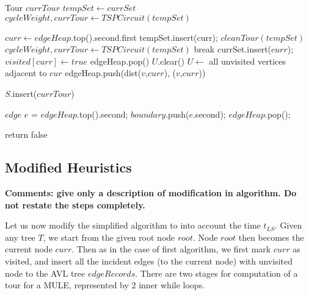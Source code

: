 \begin{algorithm}
\begin{algorithmic}
	
	\State Tour $currTour$ 
	\State $tempSet \gets currSet$ 
	\State $cycleWeight , currTour \gets TSPCircuit(tempSet)$

		\State $curr \gets edgeHeap$.top().second.first 
		\State tempSet.insert(curr);
		\State $cleanTour(tempSet)$
		\State $cycleWeight, currTour \gets TSPCircuit(tempSet)$ 
			\State break 
		\EndIf
		\State currSet.insert($curr$);
		\State $visited[curr] \gets true$ 
		\State edgeHeap.pop() 
		\State $U$.clear() 
		\State $U  \gets$ all unvisited vertices adjacent to $cur$ 
			\State edgeHeap.push(dist($v$,$curr$), ($v$,$curr$)) 
		\EndFor
	\EndWhile
	
	\State $S$.insert($currTour$) 

		\State $edge$ $e$ = $edgeHeap$.top().second;
		\State $boundary$.push($e$.second);
		\State $edgeHeap$.pop();
	\EndWhile
	
		\State return false 
	\EndIf

\EndWhile
\EndFunction

\EndFunction

\end{algorithmic}
\end{algorithm}

\pagebreak
\subsection{Modified Heuristics}

{\bf Comments: give only a description of modification in algorithm. Do not
restate the steps completely.}

Let us now modify the simplified algorithm to into account the time $t_{LS}$. Given any tree $T$, we start from the given root node $root$. Node $root$ then becomes the current node $curr$. Then as in the case of first algorithm, we first mark $curr$ as visited, and insert all the incident edges (to the current node) with unvisited node to the AVL tree $edgeRecords$. There are two stages for computation of a tour for a MULE, represented by 2 inner while loops.

